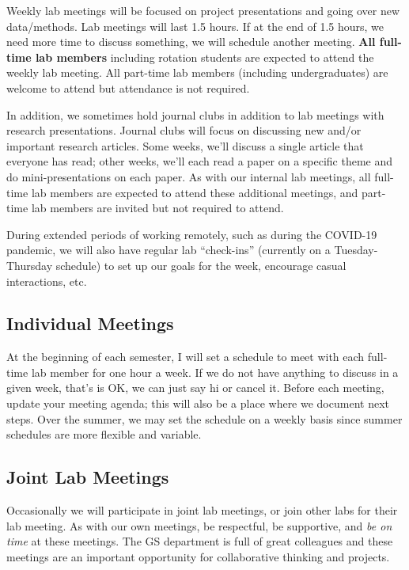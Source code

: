 \documentclass[
]{book}
\begin{document}
Weekly lab meetings will be focused on project presentations and going over new data/methods. Lab meetings will last 1.5 hours. If at the end of 1.5 hours, we need more time to discuss something, we will schedule another meeting. \textbf{All full-time lab members} including rotation students are expected to attend the weekly lab meeting. All part-time lab members (including undergraduates) are welcome to attend but attendance is not required.

In addition, we sometimes hold journal clubs in addition to lab meetings with research presentations. Journal clubs will focus on discussing new and/or important research articles. Some weeks, we'll discuss a single article that everyone has read; other weeks, we'll each read a paper on a specific theme and do mini-presentations on each paper. As with our internal lab meetings, all full-time lab members are expected to attend these additional meetings, and part-time lab members are invited but not required to attend.

During extended periods of working remotely, such as during the COVID-19 pandemic, we will also have regular lab ``check-ins'' (currently on a Tuesday-Thursday schedule) to set up our goals for the week, encourage casual interactions, etc.

\hypertarget{individual-meetings}{%
\subsection{Individual Meetings}\label{individual-meetings}}

At the beginning of each semester, I will set a schedule to meet with each full-time lab member for one hour a week. If we do not have anything to discuss in a given week, that's is OK, we can just say hi or cancel it. Before each meeting, update your meeting agenda; this will also be a place where we document next steps. Over the summer, we may set the schedule on a weekly basis since summer schedules are more flexible and variable.

\hypertarget{joint-lab-meetings}{%
\subsection{Joint Lab Meetings}\label{joint-lab-meetings}}

Occasionally we will participate in joint lab meetings, or join other labs for their lab meeting. As with our own meetings, be respectful, be supportive, and \emph{be on time} at these meetings. The GS department is full of great colleagues and these meetings are an important opportunity for collaborative thinking and projects.
\end{document}
